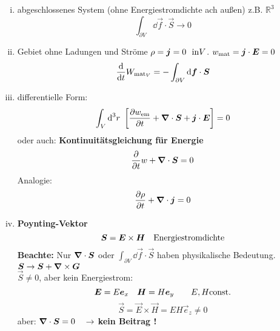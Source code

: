 \begin{enumerate}[i)]
	\item abgeschlossenes System (ohne Energiestromdichte ach außen) z.B. $ \mathbb{R}^3 $
	\begin{equation*}
	\int_{\partial V} \dd \vec{f} \cdot \vec{S} \rightarrow 0
	\end{equation*}
	\item Gebiet ohne Ladungen und Ströme $ \rho = \bm{j} = 0 \ \ \textrm{in} V $. $ w_{\textrm{mat}} = \bm{j} \cdot \bm{E} = 0 $
	\begin{equation*}
	\frac{\textrm{d} }{\textrm{d} t} W_{\textrm{mat}_V} = - \int_{\partial V} \textrm{d} \bm{f} \cdot \bm{S}
	\end{equation*}
	\item differentielle Form:
	\begin{equation*}
	\int_V \textrm{d}^3 r \ \left[\frac{\partial w_{\textrm{em}}}{\partial t} + \bm{\nabla} \cdot \bm{S} + \bm{j} \cdot \bm{E}\right] = 0
	\end{equation*}
	oder auch: \textbf{Kontinuitätsgleichung für Energie}
	\begin{equation*}
	\frac{\partial }{\partial t} w + \bm{\nabla} \cdot \bm{S} = 0
	\end{equation*}
	Analogie:
	\begin{equation*}
	\frac{\partial \rho}{\partial t} + \bm{\nabla} \cdot \bm{j} = 0
	\end{equation*}
	\item \textbf{Poynting-Vektor}
	\begin{equation*}
	\bm{S} = \bm{E} \times \bm{H} \quad \textrm{Energiestromdichte}
	\end{equation*}
	\textbf{Beachte:} Nur $ \bm{\nabla} \cdot \bm{S} $ oder $ \int_{\partial V} \dd \vec{f} \cdot \vec{S} $ haben physikalische Bedeutung.\\[5pt]
	$ \bm{S} \to \bm{S} + \bm{\nabla} \times \bm{G} $\\
	$ \vec{S} \neq 0 $, aber kein Energiestrom:
	\begin{equation*}
	\bm{E} = E \bm{e}_x \quad \bm{H} = H \bm{e}_y \qquad E,H \textrm{const.}
	\end{equation*}
	\begin{equation*}
	\vec{S} = \vec{E} \times \vec{H} = E H \vec{e}_z \neq 0
	\end{equation*}
	aber: $ \bm{\nabla} \cdot \bm{S} = 0  \quad \rightarrow $ \textbf{kein Beitrag !}
\end{enumerate}
